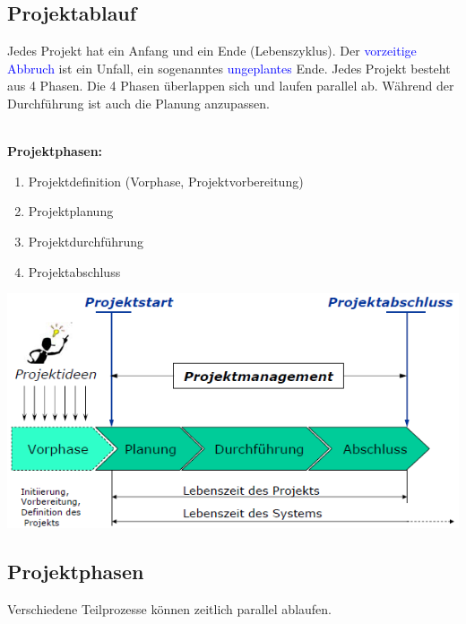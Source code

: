 \subsection{Projektablauf}
Jedes Projekt hat ein Anfang und ein Ende (Lebenszyklus). Der \textcolor{blue}{vorzeitige Abbruch} ist ein Unfall, ein sogenanntes \newline \textcolor{blue}{ungeplantes} Ende. Jedes Projekt besteht aus 4 Phasen. Die 4 Phasen überlappen sich und laufen parallel ab. \newline Während der Durchführung ist auch die Planung anzupassen. \\
\\
\begin{minipage}{8cm}
	\textbf{Projektphasen:}
	\begin{enumerate}
		\item Projektdefinition
        \subitem (Vorphase, Projektvorbereitung)
		\item Projektplanung
		\item Projektdurchführung
		\item Projektabschluss
	\end{enumerate}
\end{minipage}
\begin{minipage}{8cm}
	\includegraphics[width=\linewidth]{images/projektablauf.png}
\end{minipage}

\subsection{Projektphasen}
Verschiedene Teilprozesse können zeitlich parallel ablaufen. 
